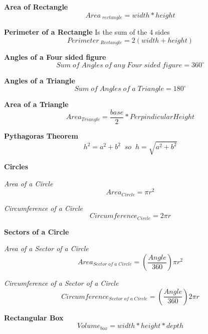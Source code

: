 \documentclass{article}
\begin{document}
\textbf{Area of Rectangle}
\begin{equation}
Area_{\;rectangle} = width * height
\end{equation}

\textbf{Perimeter of a Rectangle}
Is the sum of the 4 sides
\begin{equation}
Perimeter_{\;Rectangle} = 2 ( width + height )
\end{equation}

\textbf{Angles of a Four sided figure}
\begin{equation}
Sum\;of\;Angles\;of\;any\;Four\; sided\; figure = 360^\circ
\end{equation}


\textbf{Angles of a Triangle}
\begin{equation}
Sum\;of\;Angles\;of\;a\;Triangle = 180^\circ
\end{equation}


\textbf{Area of a Triangle}
\begin{equation}
Area_{Triangle} = \frac{base}{2} * Perpindicular Height
\end{equation}

\textbf{Pythagoras Theorem}
\begin{equation}
h^2 = a^2 + b^2 \;\;so \;\;h= \sqrt{a^2 + b^2}
\end{equation}

\textbf{Circles}

\textit{Area of a Circle}
\begin{equation}
Area_{ Circle} = \pi r^ 2
\end{equation}

\textit{Circumference of a Circle}
\begin{equation}
Circumference_{ Circle} = 2 \pi r
\end{equation}

\textbf{Sectors of a Circle}

\textit{Area of a Sector of a Circle}
\begin{equation}
Area_{ Sector\;of\;a\;Circle} = ( \frac{Angle }{ 360 }) \pi r^ 2
\end{equation}


\textit{Circumference of a Sector of a Circle}
\begin{equation}
Circumference_{ Sector\;of\;a\;Circle} = ( \frac{Angle }{ 360} ) 2 \pi r
\end{equation}


\textbf{Rectangular Box}
\begin{equation}
Volume_{box} = width * height * depth
\end{equation}
\end{document}
